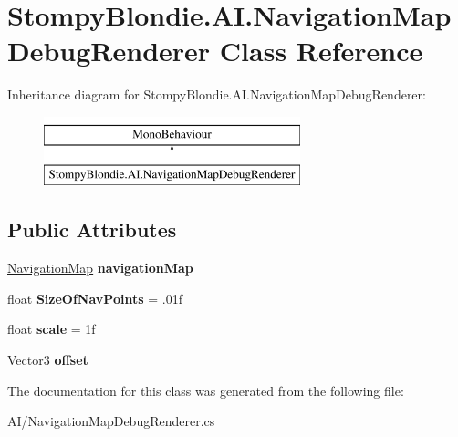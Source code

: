 \hypertarget{class_stompy_blondie_1_1_a_i_1_1_navigation_map_debug_renderer}{}\section{Stompy\+Blondie.\+A\+I.\+Navigation\+Map\+Debug\+Renderer Class Reference}
\label{class_stompy_blondie_1_1_a_i_1_1_navigation_map_debug_renderer}
Inheritance diagram for Stompy\+Blondie.\+A\+I.\+Navigation\+Map\+Debug\+Renderer\+:\begin{figure}[H]
\begin{center}
\leavevmode
\includegraphics[height=2.000000cm]{class_stompy_blondie_1_1_a_i_1_1_navigation_map_debug_renderer}
\end{center}
\end{figure}
\subsection*{Public Attributes}
\begin{DoxyCompactItemize}
\item 
\mbox{\label{class_stompy_blondie_1_1_a_i_1_1_navigation_map_debug_renderer_a0a77ce86000ac6b86e4c703876811f16}} 
\mbox{\hyperlink{class_stompy_blondie_1_1_a_i_1_1_navigation_map}{Navigation\+Map}} {\bfseries navigation\+Map}
\item 
\mbox{\label{class_stompy_blondie_1_1_a_i_1_1_navigation_map_debug_renderer_acd8a0a421c1a96bfb97b60096393f272}} 
float {\bfseries Size\+Of\+Nav\+Points} = .\+01f
\item 
\mbox{\label{class_stompy_blondie_1_1_a_i_1_1_navigation_map_debug_renderer_a7ed34eb6c899be86811aa39b64152242}} 
float {\bfseries scale} = 1f
\item 
\mbox{\label{class_stompy_blondie_1_1_a_i_1_1_navigation_map_debug_renderer_aaf4d2f24bdea73fbb609397acfacbd92}} 
Vector3 {\bfseries offset}
\end{DoxyCompactItemize}


The documentation for this class was generated from the following file\+:\begin{DoxyCompactItemize}
\item 
A\+I/Navigation\+Map\+Debug\+Renderer.\+cs\end{DoxyCompactItemize}
